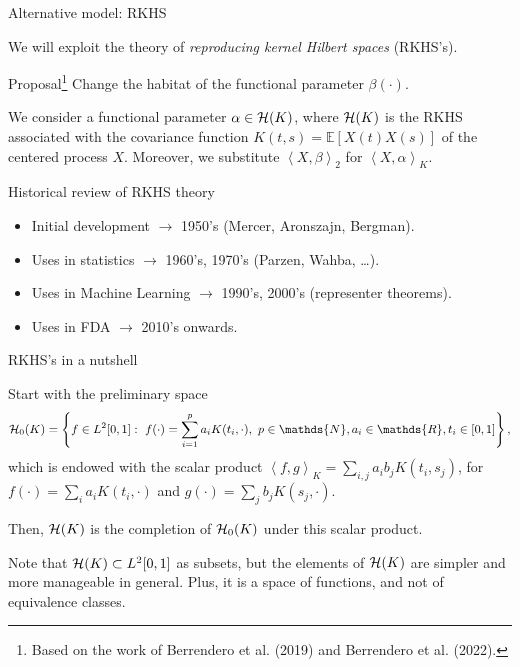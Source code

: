 \documentclass[9pt, english, professionalfonts]{beamer}
\newcommand\maroon[1]{\color{mLightBrown}#1\color{mDarkTeal}}
\newcommand{\N} {\ensuremath{\mathds{N}}}
\newcommand{\R} {\ensuremath{\mathds{R}}}
\newcommand{\Hcal} {\ensuremath\mathcal{H}}
\newcommand\dotprod[2]{\left\langle #1, #2 \right\rangle}
\begin{document}
\begin{frame}{Alternative model: RKHS}

We will exploit the theory of \textit{reproducing kernel Hilbert spaces} (RKHS's).

\vspace{1em}
\begin{alertblock}{Proposal\footnote[2]{Based on the work of Berrendero et al. (2019) and Berrendero et al. (2022).}}
  Change the habitat of the functional parameter \(\beta(\cdot)\).
\end{alertblock}

\vspace{1em}
  We consider a functional parameter \maroon{\(\alpha \in \Hcal(K)\)}, where \(\Hcal(K)\) is the RKHS associated with the covariance function \(K(t, s)=\mathbb E[X(t)X(s)]\) of the centered process \(X\). Moreover, we substitute \(\dotprod{X}{\beta}_2\) for \maroon{\(\dotprod{X}{\alpha}_K\)}.
\end{frame}

\begin{frame}{Historical review of RKHS theory}
  \begin{itemize}
    \item Initial development \(\longrightarrow\) 1950's (Mercer, Aronszajn, Bergman).
    \item Uses in statistics \(\longrightarrow\) 1960's, 1970's (Parzen, Wahba, \ldots).
    \item Uses in Machine Learning \(\longrightarrow\) 1990's, 2000's (representer theorems).
    \item Uses in FDA \(\longrightarrow\) 2010's onwards.
  \end{itemize}
\end{frame}

\begin{frame}{RKHS's in a nutshell}
  \begin{definition}
    Start with the preliminary space
    \[
    \Hcal_0(K) = \left\{ f \in L^2[0,1]: \ f(\cdot) = \sum_{i=1}^p a_i K(t_i, \cdot), \ p \in \N,  a_i \in \R,  t_i \in [0, 1] \right\},
    \]
    which is endowed with the scalar product \(\dotprod{f}{g}_K = \sum_{i, j} a_i b_j K(t_i, s_j)\), for \(f(\cdot)=\sum_i a_i K(t_i, \cdot) \) and \(g(\cdot)=\sum_j b_j K(s_j, \cdot)\).

    Then, \(\Hcal(K)\) is the completion of \(\Hcal_0(K)\) under this scalar product.
  \end{definition}

  \vspace{1em}

  Note that \(\Hcal(K)\subset L^2[0, 1]\) as subsets, but the elements of \(\Hcal(K)\) are simpler and more manageable in general. Plus, it is a space of \maroon{functions}, and not of equivalence classes.
\end{frame}
\end{document}
